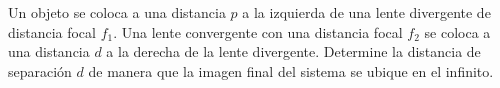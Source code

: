 \item Un objeto se coloca a una distancia $p$ a la izquierda de una lente divergente de distancia focal $f_1$. Una lente convergente con una distancia focal $f_2$ se coloca a una distancia $d$ a la derecha de la lente divergente. Determine la distancia de separación $d$ de manera que la imagen final del sistema se ubique en el infinito.